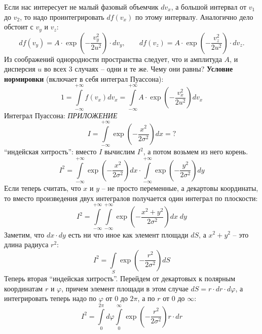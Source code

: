 \documentclass[12pt,epsfig,color,russian]{article}
\begin{document}
Если нас интересует не малый фазовый объемчик $dv_x$, а большой интервал от $v_1$ до $v_2$, то надо проинтегрировать $df(v_x)$ по этому интервалу. Анало\-ги\-чно дело обстоит с $v_y$ и $v_z$:
\begin{equation}
df(v_y)=A\cdot \exp\left(-\frac{v_y^2}{2u^2}\right)\cdot dv_y,\;\;\;\;\;\;\;
df(v_z)=A\cdot \exp\left(-\frac{v_z^2}{2u^2}\right)\cdot dv_z.
\end{equation}
Из соображений однородности пространства следует, что и амплитуда $A$, и дисперсия $u$ во всех 3 случаях -- одни и те же. Чему они равны? {\bf Условие нормировки} (включает в себя интеграл Пуассона):
\begin{displaymath}
1=\int\limits_{-\infty}^{+\infty}f(v_x)dv_x=
\int\limits_{-\infty}^{+\infty}A\cdot\exp\left(-\frac{v_x^2}{2u^2}\right)dv_x
\end{displaymath}
\newpage
Интеграл Пуассона:\hfill{ }{\LARGE\sl ПРИЛОЖЕНИЕ}
\begin{displaymath}
I=\int\limits_{-\infty}^{+\infty}\exp\left(-\frac{x^2}{2\sigma^2}\right)dx=?
\end{displaymath}
``индейская хитрость'': вместо $I$ вычислим $I^2$, а потом возьмем из него корень.
\begin{displaymath}
I^2=\int\limits_{-\infty}^{+\infty}\exp\left(-\frac{x^2}{2\sigma^2}\right)dx\cdot
    \int\limits_{-\infty}^{+\infty}\exp\left(-\frac{y^2}{2\sigma^2}\right)dy
\end{displaymath}
Если теперь считать, что $x$ и $y$ -- не просто переменные, а декартовы координаты, то
вместо произведения двух интегралов получается один интеграл по плоскости:
\begin{displaymath}
I^2=\int\limits_{-\infty}^{+\infty}\int\limits_{-\infty}^{+\infty}\exp\left(-\frac{x^2+y^2}{2\sigma^2}\right)dx\;dy
\end{displaymath}
Заметим, что $dx\cdot dy$ есть ни что иное как элемент площади $dS$, а $x^2+y^2$ -- это длина радиуса $r^2$:
\begin{displaymath}
I^2=\int\limits_S\exp\left(-\frac{r^2}{2\sigma^2}\right)dS
\end{displaymath}
Теперь вторая ``индейская хитрость''. Перейдем от декартовых к полярным координатам $r$ и $\varphi$, причем элемент площади в этом случае $dS=r\cdot dr\cdot d\varphi$, а интегрировать теперь надо по $\varphi$ от 0 до $2\pi$, а по $r$ от 0 до $\infty$:
\begin{displaymath}
I^2=\int\limits_0^{2\pi}d\varphi\int\limits_0^\infty\exp\left(-\frac{r^2}{2\sigma^2}\right)r\cdot dr
\end{displaymath}
\end{document}
